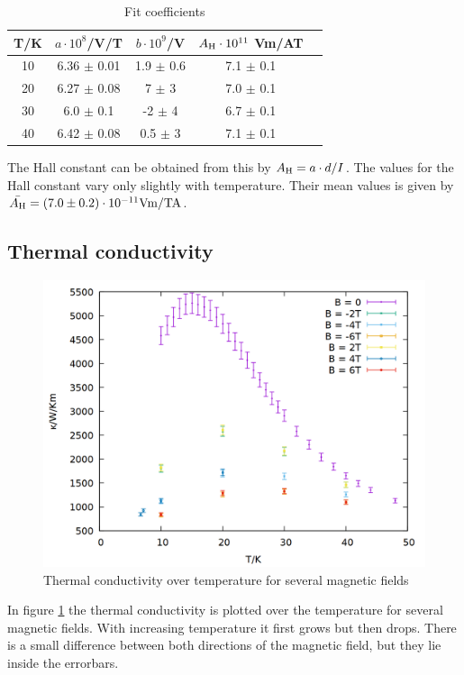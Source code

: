 \begin{table}[]
    \centering
    \begin{tabular}{ccccc}
    \toprule
    T/K & $a\cdot 10^8$/V/T & $b\cdot 10^9$/V & $A\ind{H}\cdot 10^{11}$ Vm/AT\\ 
    \midrule
    10 & 6.36 $\pm$ 0.01 & 1.9 $\pm$ 0.6 & 7.1 $\pm$ 0.1\\
    20 & 6.27 $\pm$ 0.08 & 7 $\pm$ 3 & 7.0 $\pm$ 0.1\\
    30 & 6.0 $\pm$ 0.1 & -2 $\pm$ 4 & 6.7 $\pm$ 0.1\\
    40 & 6.42 $\pm$ 0.08 & 0.5 $\pm$ 3 & 7.1 $\pm$ 0.1\\
    \bottomrule
    \end{tabular}
    \caption{Fit coefficients}
    \label{tab:rho_hall}
\end{table}

The Hall constant can be obtained from this by $A\ind{H} = a \cdot d/I$. The values for the Hall   constant vary only slightly with temperature. Their mean values is given by $\bar{A\ind{H}} = (7.0 \pm	0.2) \cdot 10^{-11} \si{Vm/TA}$.

\subsection{Thermal conductivity}
\begin{figure}
    \centering
    \includegraphics[width=0.7\linewidth]{data/wlf_B.png}
    \caption{Thermal conductivity over temperature for several magnetic fields}
    \label{fig:wlf_B}
\end{figure}

In figure \ref{fig:wlf_B} the thermal conductivity is plotted over the temperature for several magnetic fields. With increasing temperature it first grows but then drops. There is a small difference between both directions of the magnetic field, but they lie inside the errorbars.

